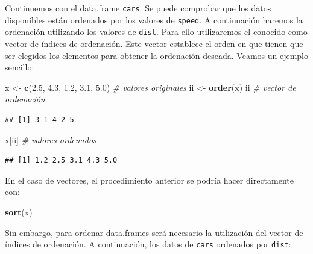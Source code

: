 \documentclass[]{book}
\newenvironment{Shaded}{\begin{snugshade}}{\end{snugshade}}
\newcommand{\KeywordTok}[1]{\textcolor[rgb]{0.13,0.29,0.53}{\textbf{#1}}}
\newcommand{\FloatTok}[1]{\textcolor[rgb]{0.00,0.00,0.81}{#1}}
\newcommand{\StringTok}[1]{\textcolor[rgb]{0.31,0.60,0.02}{#1}}
\newcommand{\CommentTok}[1]{\textcolor[rgb]{0.56,0.35,0.01}{\textit{#1}}}
\newcommand{\OperatorTok}[1]{\textcolor[rgb]{0.81,0.36,0.00}{\textbf{#1}}}
\newcommand{\NormalTok}[1]{#1}
\begin{document}
Continuemos con el data.frame \texttt{cars}. Se puede comprobar que los
datos disponibles están ordenados por los valores de \texttt{speed}. A
continuación haremos la ordenación utilizando los valores de
\texttt{dist}. Para ello utilizaremos el conocido como vector de índices
de ordenación. Este vector establece el orden en que tienen que ser
elegidos los elementos para obtener la ordenación deseada. Veamos un
ejemplo sencillo:

\begin{Shaded}
\begin{Highlighting}[]
\NormalTok{x <-}\StringTok{ }\KeywordTok{c}\NormalTok{(}\FloatTok{2.5}\NormalTok{, }\FloatTok{4.3}\NormalTok{, }\FloatTok{1.2}\NormalTok{, }\FloatTok{3.1}\NormalTok{, }\FloatTok{5.0}\NormalTok{) }\CommentTok{# valores originales}
\NormalTok{ii <-}\StringTok{ }\KeywordTok{order}\NormalTok{(x)}
\NormalTok{ii    }\CommentTok{# vector de ordenación}
\end{Highlighting}
\end{Shaded}

\begin{verbatim}
## [1] 3 1 4 2 5
\end{verbatim}

\begin{Shaded}
\begin{Highlighting}[]
\NormalTok{x[ii] }\CommentTok{# valores ordenados}
\end{Highlighting}
\end{Shaded}

\begin{verbatim}
## [1] 1.2 2.5 3.1 4.3 5.0
\end{verbatim}

En el caso de vectores, el procedimiento anterior se podría hacer
directamente con:

\begin{Shaded}
\begin{Highlighting}[]
\KeywordTok{sort}\NormalTok{(x)}
\end{Highlighting}
\end{Shaded}

Sin embargo, para ordenar data.frames será necesario la utilización del
vector de índices de ordenación. A continuación, los datos de
\texttt{cars} ordenados por \texttt{dist}:

\begin{Shaded}
\end{Shaded}
\end{document}
